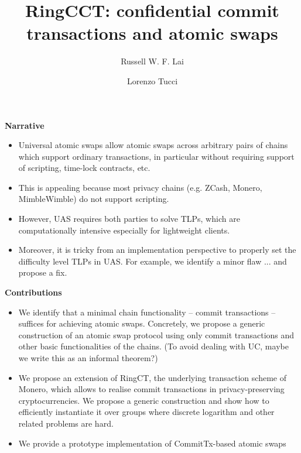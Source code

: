 \documentclass{article}      	%
\begin{document}
         
\author{Russell W. F. Lai \and Lorenzo Tucci}
\title{RingCCT: confidential commit transactions and atomic swaps}

\maketitle

\tableofcontents
\newpage


\begin{todobox}
\textbf{Narrative}
\begin{itemize}
\item Universal atomic swaps allow atomic swaps across arbitrary pairs of chains which support ordinary transactions, in particular without requiring support of scripting, time-lock contracts, etc.
\item This is appealing because most privacy chains (e.g. ZCash, Monero, MimbleWimble) do not support scripting.
\item However, UAS requires both parties to solve TLPs, which are computationally intensive especially for lightweight clients.
\item Moreover, it is tricky from an implementation perspective to properly set the difficulty level TLPs in UAS. For example, we identify a minor flaw ... and propose a fix.
\end{itemize}

\textbf{Contributions}
\begin{itemize}
\item We identify that a minimal chain functionality -- commit transactions -- suffices for achieving atomic swaps. Concretely, we propose a generic construction of an atomic swap protocol using only commit transactions and other basic functionalities of the chains. (To avoid dealing with UC, maybe we write this as an informal theorem?)
\item We propose an extension of RingCT, the underlying transaction scheme of Monero, which allows to realise commit transactions in privacy-preserving cryptocurrencies. We propose a generic construction and show how to efficiently instantiate it over groups where discrete logarithm and other related problems are hard. 
\item We provide a prototype implementation of CommitTx-based atomic swaps
\end{itemize}
\end{todobox}







\end{document}
